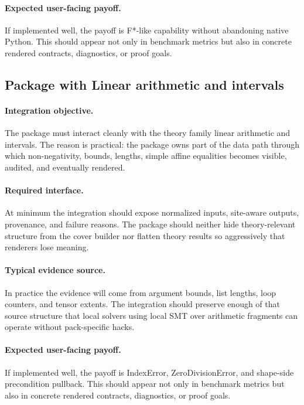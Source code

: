 \documentclass[11pt]{report}
\DeclareRobustCommand{\py}[1]{\texttt{\detokenize{#1}}}
\theoremstyle{definition}
\theoremstyle{plain}
\begin{document}
\paragraph{Expected user-facing payoff.}
If implemented well, the payoff is F*-like capability without abandoning native Python. This should appear not only
in benchmark metrics but also in concrete rendered contracts,
diagnostics, or proof goals.


\subsection{Package \py{src/deppy/core} with Linear arithmetic and intervals}

\paragraph{Integration objective.}
The package \py{src/deppy/core} must interact cleanly with the
theory family linear arithmetic and intervals. The reason is practical: the
package owns part of the data path through which non-negativity, bounds, lengths, simple affine equalities becomes
visible, audited, and eventually rendered.

\paragraph{Required interface.}
At minimum the integration should expose normalized inputs, site-aware
outputs, provenance, and failure reasons. The package should neither hide
theory-relevant structure from the cover builder nor flatten theory
results so aggressively that renderers lose meaning.

\paragraph{Typical evidence source.}
In practice the evidence will come from argument bounds, list lengths, loop counters, and tensor extents. The integration should
preserve enough of that source structure that local solvers using local SMT over arithmetic fragments
can operate without pack-specific hacks.

\paragraph{Expected user-facing payoff.}
If implemented well, the payoff is IndexError, ZeroDivisionError, and shape-side precondition pullback. This should appear not only
in benchmark metrics but also in concrete rendered contracts,
diagnostics, or proof goals.
\end{document}
